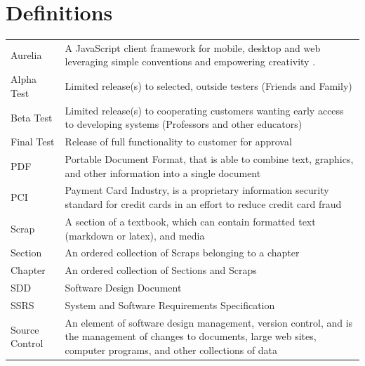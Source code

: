 \documentclass[onecolumn, draftclsnofoot,10pt, compsoc]{IEEEtran}
\begin{document}
\section{Definitions}
\begin{center}


\begin{supertabular}{p{3cm}p{12cm}}

	Aurelia 
	& A JavaScript client framework for mobile, desktop and web leveraging
	simple conventions and empowering creativity \cite{Aurelia}. \\

	Alpha Test 
	& Limited release(s) to selected, outside testers (Friends and Family)\\

	Beta Test 
	& Limited release(s) to cooperating customers wanting early
	access to developing systems (Professors and other educators)\\

	Final Test 
	& Release of full functionality to customer for approval \\

	PDF 
	& Portable Document Format, that is able to combine text,
	graphics, and other information into a single document \\

	PCI 
	& Payment Card Industry, is a proprietary information security
	standard for credit cards in an effort to reduce credit card fraud \\

	Scrap 
	& A section of a textbook, which can contain formatted text 
	(markdown or latex), and media \\

	Section 
	& An ordered collection of Scraps belonging to a chapter\\

	Chapter 
	& An ordered collection of Sections and Scraps\\

	SDD 
	& Software Design Document \\

	SSRS 
	& System and Software Requirements Specification \\

	Source Control 
	& An element of software design management, version control, and 
		is the management of changes to documents, large web sites, 
		computer programs, and other collections of data \\


\end{supertabular}
\end{center}
\end{document}

